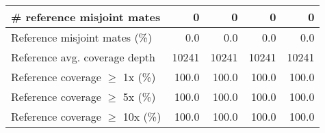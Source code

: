 \documentclass[12pt,a4paper]{article}
\begin{document}
\begin{table}[ht]
\begin{center}
\begin{tabular}{|l*{4}{|r}|}
\# reference misjoint mates & 0 & 0 & 0 & 0 \\ \hline
Reference misjoint mates (\%) & 0.0 & 0.0 & 0.0 & 0.0 \\ \hline
Reference avg. coverage depth & 10241 & 10241 & 10241 & 10241 \\ \hline
Reference coverage $\geq$ 1x (\%) & 100.0 & 100.0 & 100.0 & 100.0 \\ \hline
Reference coverage $\geq$ 5x (\%) & 100.0 & 100.0 & 100.0 & 100.0 \\ \hline
Reference coverage $\geq$ 10x (\%) & 100.0 & 100.0 & 100.0 & 100.0 \\ \hline
\end{tabular}
\end{center}
\end{table}
\end{document}
